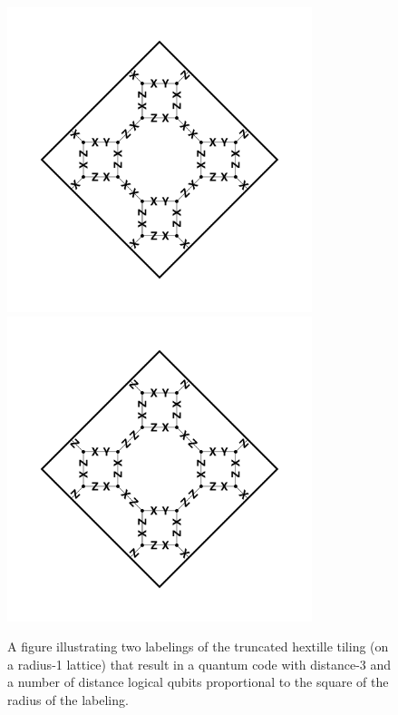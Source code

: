 \documentclass[twocolumn,showpacs,preprintnumbers,amsmath,amssymb,nofootinbib,pra,floatfix]{revtex4-1}
\begin{document}
\begin{figure}
\includegraphics[width=3.5in]{truncated-quadrille-code-3-labeling-1} %
\includegraphics[width=3.5in]{truncated-quadrille-code-3-labeling-2} %
\caption{
\label{figure:truncated-hextille-code-3-labelings}
A figure illustrating two labelings of the truncated hextille tiling (on a radius-1 lattice) that result in a quantum code with distance-3 and a number of distance logical qubits proportional to the square of the radius of the labeling.
}
\end{figure}
\end{document}
